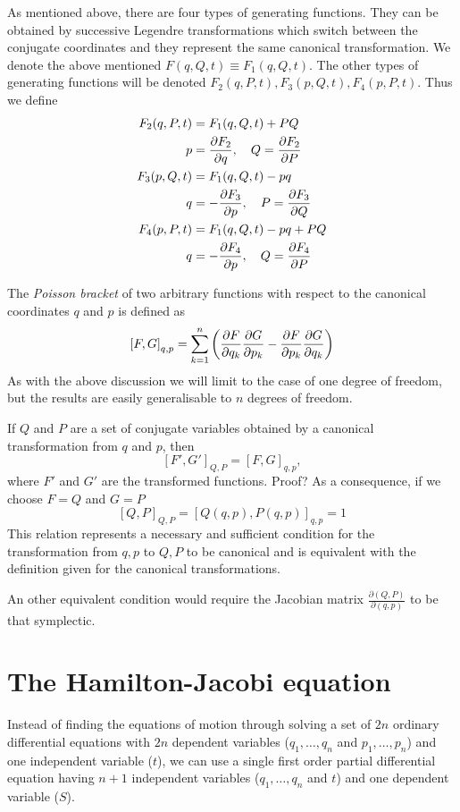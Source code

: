 \documentclass[../thesis.tex]{subfiles}
\theoremstyle{plain}
\begin{document}
As mentioned above, there are four types of generating functions. They can be obtained
by successive Legendre transformations which switch between the conjugate coordinates and
they represent the same canonical transformation. We denote the above mentioned
\(F(q, Q, t) \equiv F_1(q, Q, t)\). The other types of generating functions will be denoted
\(F_2(q, P, t), F_3(p, Q, t), F_4(p, P, t)\). Thus we define
\begin{align*}
  F_2(q, P, t) &= F_1(q, Q, t) + PQ \\
  p &= \pdv{F_2}{q},\quad Q = \pdv{F_2}{P} \\
  F_3(p, Q, t) &= F_1(q, Q, t) - pq \\
  q &= - \pdv{F_3}{p},\quad P = \pdv{F_3}{Q} \\
  F_4(p, P, t) &= F_1(q, Q, t) - pq + PQ \\
  q &= - \pdv{F_4}{p},\quad Q = \pdv{F_4}{P}
\end{align*}


The \emph{Poisson bracket} of two arbitrary functions with respect to the canonical coordinates
$q$ and $p$ is defined as
\[
  {\left[F, G\right]}_{q,p} = \sum_{k=1}^n \left( \pdv{F}{q_k} \pdv{G}{p_k} -
                                                  \pdv{F}{p_k} \pdv{G}{q_k} \right)
\]
As with the above discussion we will limit to the case of one degree of freedom,
but the results are easily generalisable to $n$ degrees of freedom.

If $Q$ and $P$ are a set of conjugate variables obtained by a canonical transformation
from $q$ and $p$, then
\[
  {\left[F', G'\right]}_{Q,P} = {\left[F, G\right]}_{q,p},
\]
where $F'$ and $G'$ are the transformed functions.
{\color{red}Proof?}
As a consequence, if we choose \(F=Q\) and \(G=P\)
\[
  {\left[Q, P\right]}_{Q,P} = {\left[Q(q,p), P(q,p)\right]}_{q,p} = 1
\]
This relation represents a necessary and sufficient condition for the transformation from
$q,p$ to $Q,P$ to be canonical and is equivalent with the definition given for the
canonical transformations.

An other equivalent condition would require the Jacobian matrix
\(\frac{\partial(Q,P)}{\partial(q,p)}\) to be that symplectic.

\section{The Hamilton-Jacobi equation}

Instead of finding the equations of motion through solving a set of \(2n\) ordinary differential
equations with \(2n\) dependent variables (\(q_1, \dotsc, q_n\) and \(p_1, \dotsc, p_n\))
and one independent variable (\(t\)), we can use a single first order partial differential equation
having \(n+1\) independent variables (\(q_1, \dotsc, q_n\) and \(t\)) and one
dependent variable (\(S\)).
\end{document}
